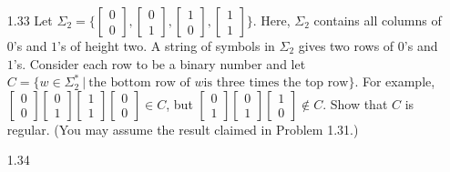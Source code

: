 \begin{enumerate}
\item [1.33]
Let $\Sigma_2 = \Biggl \{ \begin{bmatrix}0 \\0\end{bmatrix} , \begin{bmatrix}0 \\1\end{bmatrix} , \begin{bmatrix}1\\ 0\end{bmatrix}, \begin{bmatrix}1 \\1\end{bmatrix} \Biggl\}$. Here, $\Sigma_2$ contains all columns of $0$'s and $1$'s of height two. A string of symbols in $\Sigma_2$ gives two rows of $0$'s and $1$'s. Consider each row to be a binary number and let $C =\{w \in \Sigma^\ast_2~|~\text{the bottom row of }w \text{is three times the top row}\}$. For example, $\begin{bmatrix}0 \\0 \end{bmatrix}\begin{bmatrix}0\\ 1 \end{bmatrix}\begin{bmatrix}1 \\1 \end{bmatrix}\begin{bmatrix}0 \\0\end{bmatrix} \in C$, but $\begin{bmatrix}0 \\1\end{bmatrix} \begin{bmatrix}0\\ 1\end{bmatrix} \begin{bmatrix}1\\ 0\end{bmatrix} \notin C$. Show that $C$ is regular. (You may assume the result claimed in Problem 1.31.)

\item [1.34]

\end{enumerate}
